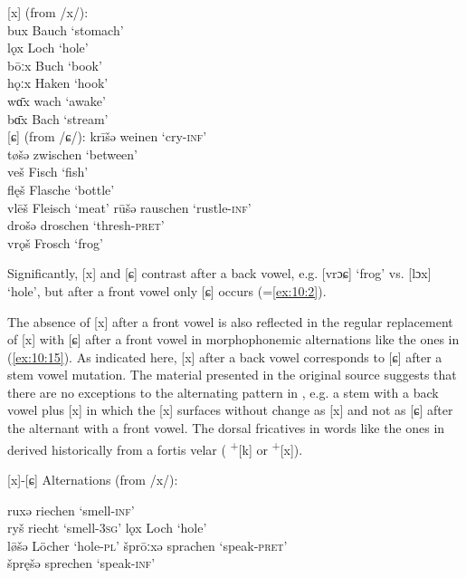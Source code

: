 \ea\label{ex:10:13} [x] (from /x/):\\
bux \tab [bux] \tab Bauch \tab ‘stomach’ \\
lǫx \tab [lɔx] \tab Loch \tab ‘hole’ \\
bōːx \tab [boːx] \tab Buch \tab ‘book’ \\
hǫːx \tab [hɔːx] \tab Haken \tab ‘hook’ \\
wɑ̄x \tab [βɑːx] \tab wach \tab ‘awake’ \\
bɑ̄x \tab [bɑːx] \tab Bach \tab ‘stream’ \\
\pagebreak
\ex%
\label{ex:10:14} [ɕ] (from /ɕ/):
\ea\label{ex:10:14a} krīšǝ \tab [kriːɕǝ] \tab weinen \tab ‘cry-\textsc{inf}’ \\
    tøšǝ \tab [tøɕǝ] \tab zwischen \tab ‘between’ \\
    veš \tab [veɕ] \tab Fisch \tab ‘fish’ \\
    flęš \tab [flɛɕ] \tab Flasche \tab ‘bottle’ \\
    vlēš \tab [vleːɕ] \tab Fleisch \tab ‘meat’ 
\ex\label{ex:10:14b} rūšǝ \tab [ruːɕǝ] \tab rauschen \tab ‘rustle-\textsc{inf}’ \\
    drošǝ \tab [droɕǝ] \tab droschen \tab ‘thresh-\textsc{pret}’ \\
    vrǫš \tab [vrɔɕ] \tab Frosch \tab ‘frog’ 
   \z
\z 

Significantly, [x] and [ɕ] contrast after a back vowel, e.g. [vrɔɕ]  ‘frog’ vs. [lɔx] ‘hole’, but after a front vowel only [ɕ] occurs (=\ref{ex:10:2}).

The absence of [x] after a front vowel is also reflected in the regular replacement of [x] with [ɕ] after a front vowel in morphophonemic alternations like the ones in (\ref{ex:10:15}). As indicated here, [x] after a back vowel corresponds to [ɕ] after a stem vowel mutation. The material presented in the original source suggests that there are no exceptions to the alternating pattern in , e.g. a stem with a back vowel plus [x] in which the [x] surfaces without change as [x] and not as [ɕ] after the alternant with a front vowel.  The dorsal fricatives in words like the ones in  derived historically from a fortis velar ( \textsuperscript{+}[k] or \textsuperscript{+}[x]).

\ea%
\label{ex:10:15} [x]-[ɕ] Alternations (from /x/):

\ea\label{ex:10:15a}   ruxǝ \tab [ruxǝ] \tab riechen \tab ‘smell-\textsc{inf}’ \\
      ryš \tab [ryɕ] \tab riecht \tab ‘smell-\textsc{3sg}’ 
\ex\label{ex:10:15b}   lǫx \tab [lɔx] \tab Loch \tab ‘hole’ \\
      l\={ø}šǝ \tab [løːɕǝ] \tab Löcher \tab ‘hole-\textsc{pl}’ 
\ex\label{ex:10:15c}   šprōːxǝ \tab [ʃproːxǝ] \tab sprachen \tab ‘speak-\textsc{pret}’ \\
      špręšǝ \tab [ʃprɛɕǝ] \tab sprechen \tab ‘speak-\textsc{inf}’ 
\z 
\z 
    
